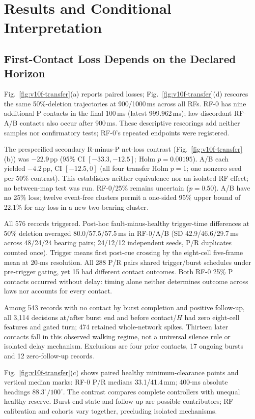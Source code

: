 \section{Results and Conditional Interpretation}
\subsection{First-Contact Loss Depends on the Declared Horizon}
Fig.~\ref{fig:v10f-transfer}(a) reports paired losses; Fig.~\ref{fig:v10f-transfer}(d) rescores the same 50\%-deletion trajectories at 900/1000\,ms across all RFs. RF-0 has nine additional P contacts in the final 100\,ms (latest 999.962\,ms); law-discordant RF-A/B contacts also occur after 900\,ms. These descriptive rescorings add neither samples nor confirmatory tests; RF-0's repeated endpoints were registered.

The prespecified secondary R-minus-P net-loss contrast (Fig.~\ref{fig:v10f-transfer}(b)) was $-22.9$\,pp (95\% CI $[-33.3,-12.5]$; Holm $p=0.00195$). A/B each yielded $-4.2$\,pp, CI $[-12.5,0]$ (all four transfer Holm $p=1$; one nonzero seed per 50\% contrast). This establishes neither equivalence nor an isolated RF effect; no between-map test was run. RF-0/25\% remains uncertain ($p=0.50$). A/B have no 25\% loss; twelve event-free clusters permit a one-sided 95\% upper bound of 22.1\% for any loss in a new two-bearing cluster.

All 576 records triggered. Post-hoc fault-minus-healthy trigger-time differences at 50\% deletion averaged 80.0/57.5/57.5\,ms in RF-0/A/B (SD 42.9/46.6/29.7\,ms across 48/24/24 bearing pairs; 24/12/12 independent seeds, P/R duplicates counted once). Trigger means first post-cue crossing by the eight-cell five-frame mean at 20-ms resolution. All 288 P/R pairs shared trigger/burst schedules under pre-trigger gating, yet 15 had different contact outcomes. Both RF-0 25\% P contacts occurred without delay: timing alone neither determines outcome across laws nor accounts for every contact.

Among 543 records with no contact by burst completion and positive follow-up, all 3,114 decisions at/after burst end and before contact/$H$ had zero eight-cell features and gated turn; 474 retained whole-network spikes. Thirteen later contacts fall in this observed walking regime, not a universal silence rule or isolated delay mechanism. Exclusions are four prior contacts, 17 ongoing bursts and 12 zero-follow-up records.

Fig.~\ref{fig:v10f-transfer}(c) shows paired healthy minimum-clearance points and vertical median marks: RF-0 P/R medians 33.1/41.4\,mm; 400-ms absolute headings $88.3^\circ/100^\circ$. The contrast compares complete controllers with unequal healthy reserve. Burst-end state and follow-up are possible contributors; RF calibration and cohorts vary together, precluding isolated mechanisms.

